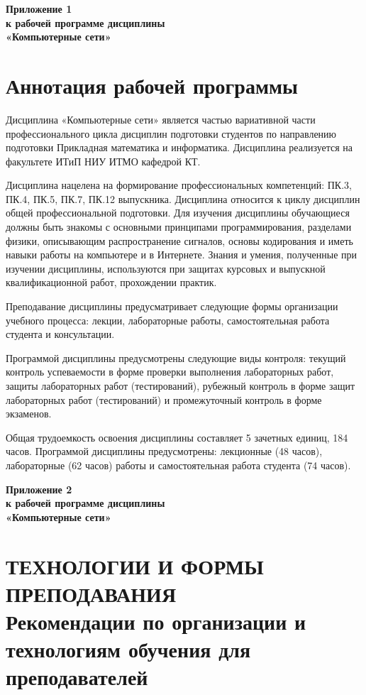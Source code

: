 \newpage
\begin{flushright}
\textbf{Приложение 1\\
к рабочей программе дисциплины\\
«Компьютерные сети»}
\end{flushright}
\section*{Аннотация рабочей программы}

Дисциплина «Компьютерные сети» является частью вариативной части профессионального цикла дисциплин подготовки студентов по направлению подготовки Прикладная математика и информатика.
Дисциплина реализуется на факультете ИТиП НИУ ИТМО кафедрой КТ.

Дисциплина нацелена на формирование профессиональных компетенций: ПК.3, ПК.4, ПК.5, ПК.7, ПК.12 выпускника. Дисциплина относится к циклу дисциплин общей профессиональной подготовки. Для изучения дисциплины обучающиеся должны быть знакомы с основными принципами программирования, разделами физики, описывающим распространение сигналов, основы кодирования и иметь навыки работы на компьютере и в Интернете. Знания и умения, полученные при изучении дисциплины, используются при защитах курсовых и выпускной квалификационной работ, прохождении практик.

Преподавание дисциплины предусматривает следующие формы организации учебного процесса: лекции, лабораторные работы, самостоятельная работа студента и консультации.

Программой дисциплины предусмотрены следующие виды контроля: текущий контроль успеваемости в форме
проверки выполнения лабораторных работ, защиты лабораторных работ (тестирований), рубежный контроль в форме защит лабораторных работ (тестирований) и промежуточный контроль в форме экзаменов.

Общая трудоемкость освоения дисциплины составляет 5 зачетных единиц, 184 часов. Программой дисциплины предусмотрены: лекционные   (48 часов), лабораторные (62 часов) работы и самостоятельная работа студента (74 часов).

\newpage
\begin{flushright}
\textbf{Приложение 2\\
к рабочей программе дисциплины\\
«Компьютерные сети»}
\end{flushright}

\section*{ТЕХНОЛОГИИ И ФОРМЫ ПРЕПОДАВАНИЯ\\
Рекомендации по организации и технологиям обучения для преподавателей}

